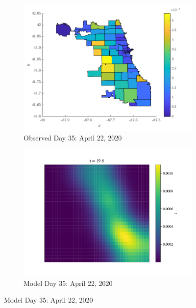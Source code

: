 \documentclass[11pt]{article}
\begin{document}
\begin{figure}[H]
			\begin{subfigure}{0.5\textwidth}
				\includegraphics[width=\textwidth]{tmid-cases}
				\caption{Observed Day 35: April 22, 2020}
			\end{subfigure}%
			\begin{subfigure}{0.5\textwidth}
				\includegraphics[width=\textwidth]{infected_35}
				\caption{Model Day 35: April 22, 2020}
			\end{subfigure}
		

\end{figure}
\end{document}
